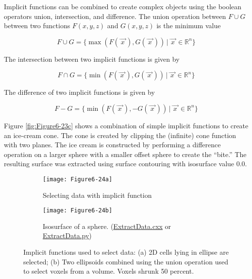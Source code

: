Implicit functions can be combined to create complex objects using the boolean operators union, intersection, and difference. The union operation between $F\cup G$ between two functions $F(x,y,z)$ and $G(x,y,z)$ is the minimum value

\begin{equation}\label{eq:6.13}
F \cup G = \lbrace \max\left(F\left(\overrightarrow{\ x\ }\right), G\left(\overrightarrow{\ x\ }\right)\right)\, \vert \, \overrightarrow{\ x\ } \in \mathbb{R}^n \rbrace
\end{equation}

The intersection between two implicit functions is given by

\begin{equation}\label{eq:6.14}
F \cap G = \lbrace \min\left(F\left(\overrightarrow{\ x\ }\right), G\left(\overrightarrow{\ x\ }\right)\right)\, \vert \, \overrightarrow{\ x\ } \in \mathbb{R}^n  \rbrace
\end{equation}

The difference of two implicit functions is given by

\begin{equation}\label{eq:6.15}
F - G = \lbrace \min\left(F\left(\overrightarrow{\ x\ }\right), -G\left(\overrightarrow{\ x\ }\right)\right)\, \vert \, \overrightarrow{\ x\ } \in \mathbb{R}^n  \rbrace
\end{equation}

Figure \ref{fig:Figure6-23c} shows a combination of simple implicit functions to create an ice-cream cone. The cone is created by clipping the (infinite) cone function with two planes. The ice cream is constructed by performing a difference operation on a larger sphere with a smaller offset sphere to create the ``bite.'' The resulting surface was extracted using surface contouring with isosurface value $0.0$.

\begin{figure}[htb]
	\begin{subfigure}[h]{0.48\linewidth}
		\texttt{[image: Figure6-24a]}
		\caption{Selecting data with implicit function}
		\label{fig:Figure6-24a}
	\end{subfigure}
	\hfill
	\begin{subfigure}[h]{0.48\linewidth}
		\texttt{[image: Figure6-24b]}
		\caption{Isosurface of a sphere. (\href{https://lorensen.github.io/VTKExamples/site/Cxx/VisualizationAlgorithms/ExtractData}{ExtractData.cxx} or \href{https://lorensen.github.io/VTKExamples/site/Python/VisualizationAlgorithms/ExtractData/}{ExtractData.py})}
		\label{fig:Figure6-24b}
	\end{subfigure}
	\caption{Implicit functions used to select data: (a) 2D cells lying in ellipse are selected; (b) Two ellipsoids combined using the union operation used to select voxels from a volume. Voxels shrunk 50 percent.}\label{fig:Figure6-24}
\end{figure}

